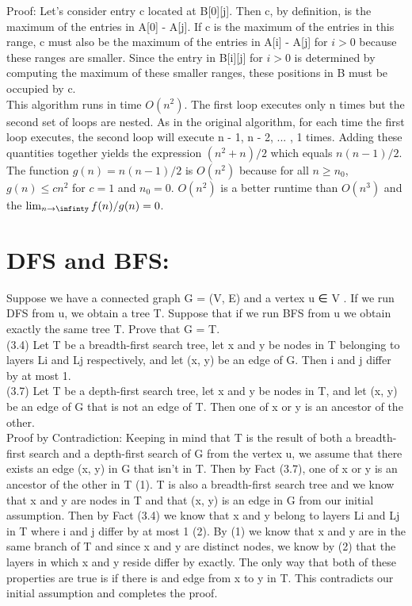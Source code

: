 \documentclass{article}
\begin{document}
Proof: Let's consider entry c located at B[0][j]. Then c, by definition, is the maximum of the entries in A[0] - A[j]. If c is the maximum of the entries in this range, c must also be the maximum of the entries in A[i] - A[j] for $i > 0$ because these ranges are smaller. Since the entry in B[i][j] for $i > 0$ is determined by computing the maximum of these smaller ranges, these positions in B must be occupied by c.\\
This algorithm runs in time $O(n^2)$. The first loop executes only n times but the second set of loops are nested. As in the original algorithm, for each time the first loop executes, the second loop will execute n - 1, n - 2, ... , 1 times. Adding these quantities together yields the expression $(n^2 + n)/2$ which equals $n(n-1)/2$. The function $g(n) = n(n-1)/2$ is $O(n^2)$ because for all $n \geq n_0$, $g(n) \leq cn^2$ for $c = 1$ and $n_0 = 0$. $O(n^2)$ is a better runtime than $O(n^3)$ and the $\lim_{n\to\infinty} f(n)/g(n) = 0$.\\

\section{DFS and BFS:}
Suppose we have a connected graph G = (V, E)
and a vertex u ∈ V . If we run DFS from u, we obtain a tree T. Suppose that if we run BFS from u we
obtain exactly the same tree T. Prove that G = T.\\

(3.4) Let T be a breadth-first search tree, let x and y be nodes in T belonging
to layers Li and Lj respectively, and let (x, y) be an edge of G. Then i and j differ
by at most 1.\\
(3.7) Let T be a depth-first search tree, let x and y be nodes in T, and let (x, y) be an edge of G that is not an edge of T. Then one of x or y is an ancestor
of the other.\\
Proof by Contradiction: Keeping in mind that T is the result of both a breadth-first search and a depth-first search of G from the vertex u, we assume that there exists an edge (x, y) in G that isn't in T. Then by Fact (3.7), one of x or y is an ancestor of the other in T (1). T is also a breadth-first search tree and we know that x and y are nodes in T and that (x, y) is an edge in G from our initial assumption. Then by Fact (3.4) we know that x and y belong to layers Li and Lj in T where i and j differ by at most 1 (2). By (1) we know that x and y are in the same branch of T and since x and y are distinct nodes, we know by (2) that the layers in which x and y reside differ by exactly. The only way that both of these properties are true is if there is and edge from x to y in T. This contradicts our initial assumption and completes the proof.  
\end{document}
